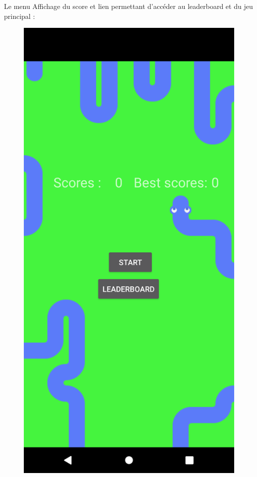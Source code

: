 \documentclass{beamer}
\begin{document}
\begin{frame}{Le menu}
  Affichage du score et lien permettant d'accéder au leaderboard et du jeu principal :
  \begin{figure}
      \centering
      \includegraphics[scale=0.07]{MenuActi.png}
  \end{figure}
\end{frame}
\end{document}
